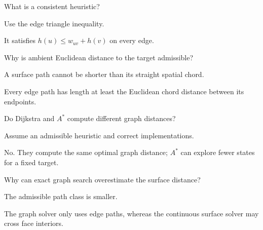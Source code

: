 \begin{exercise}\label{exr:vii39-10}
What is a consistent heuristic?
\end{exercise}

\begin{hint}
Use the edge triangle inequality.
\end{hint}

\begin{solution}
It satisfies \(h(u)\le w_{uv}+h(v)\) on every edge.
\end{solution}

\begin{exercise}\label{exr:vii39-11}
Why is ambient Euclidean distance to the target admissible?
\end{exercise}

\begin{hint}
A surface path cannot be shorter than its straight spatial chord.
\end{hint}

\begin{solution}
Every edge path has length at least the Euclidean chord distance between its endpoints.
\end{solution}

\begin{exercise}\label{exr:vii39-12}
Do Dijkstra and \(A^\ast\) compute different graph distances?
\end{exercise}

\begin{hint}
Assume an admissible heuristic and correct implementations.
\end{hint}

\begin{solution}
No.  They compute the same optimal graph distance; \(A^\ast\) can explore fewer states for a fixed target.
\end{solution}

\begin{exercise}\label{exr:vii39-13}
Why can exact graph search overestimate the surface distance?
\end{exercise}

\begin{hint}
The admissible path class is smaller.
\end{hint}

\begin{solution}
The graph solver only uses edge paths, whereas the continuous surface solver may cross face interiors.
\end{solution}

